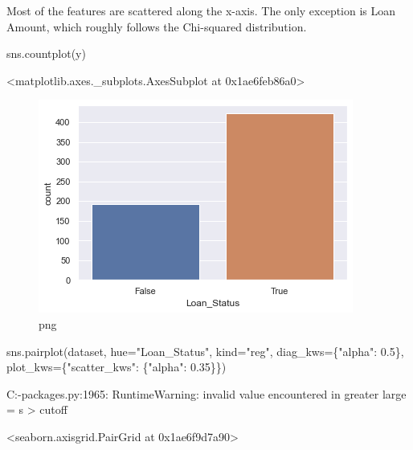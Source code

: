 \documentclass[]{article}
\newenvironment{Shaded}{}{}
\newcommand{\FloatTok}[1]{\textcolor[rgb]{0.25,0.63,0.44}{#1}}
\newcommand{\NormalTok}[1]{#1}
\newcommand{\OperatorTok}[1]{\textcolor[rgb]{0.40,0.40,0.40}{#1}}
\newcommand{\StringTok}[1]{\textcolor[rgb]{0.25,0.44,0.63}{#1}}
\begin{document}
Most of the features are scattered along the x-axis. The only exception
is Loan Amount, which roughly follows the Chi-squared distribution.

\begin{Shaded}
\begin{Highlighting}[]
\NormalTok{sns.countplot(y)}
\end{Highlighting}
\end{Shaded}

\textless{}matplotlib.axes.\_subplots.AxesSubplot at
0x1ae6feb86a0\textgreater{}

\begin{figure}
\centering
\includegraphics{notebook_files/notebook_23_1.png}
\caption{png}
\end{figure}

\begin{Shaded}
\begin{Highlighting}[]
\NormalTok{sns.pairplot(dataset, hue}\OperatorTok{=}\StringTok{"Loan_Status"}\NormalTok{, kind}\OperatorTok{=}\StringTok{"reg"}\NormalTok{, diag_kws}\OperatorTok{=}\NormalTok{\{}\StringTok{"alpha"}\NormalTok{: }\FloatTok{0.5}\NormalTok{\}, plot_kws}\OperatorTok{=}\NormalTok{\{}\StringTok{"scatter_kws"}\NormalTok{: \{}\StringTok{"alpha"}\NormalTok{: }\FloatTok{0.35}\NormalTok{\}\})}
\end{Highlighting}
\end{Shaded}

C:\Users\vojdo{}\envs\ml\lib\site-packages\numpy\linalg\linalg.py:1965:
RuntimeWarning: invalid value encountered in greater large = s
\textgreater{} cutoff

\textless{}seaborn.axisgrid.PairGrid at 0x1ae6f9d7a90\textgreater{}
\end{document}
